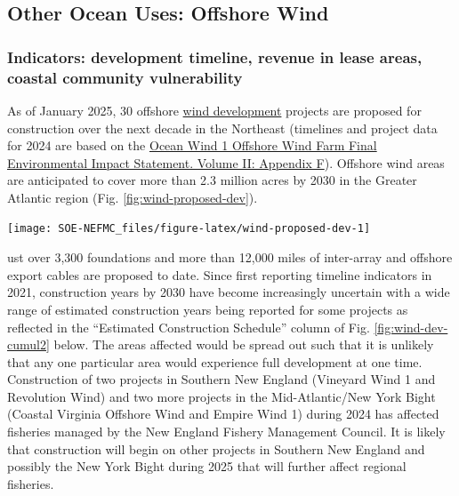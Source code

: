 \documentclass[
  10pt,
]{article}
\let\origfigure\figure
\let\endorigfigure\endfigure
\renewenvironment{figure}[1][2] {
    \expandafter\origfigure\expandafter[H]
} {
    \endorigfigure
}
\begin{document}
\hypertarget{wind-risks}{%
\subsection{Other Ocean Uses: Offshore Wind}\label{wind-risks}}

\hypertarget{indicators-development-timeline-revenue-in-lease-areas-coastal-community-vulnerability}{%
\subsubsection{Indicators: development timeline, revenue in lease areas, coastal community vulnerability}\label{indicators-development-timeline-revenue-in-lease-areas-coastal-community-vulnerability}}

As of January 2025, 30 offshore \href{https://noaa-edab.github.io/catalog/wind_dev_speed.html}{wind development} projects are proposed for construction over the next decade in the Northeast (timelines and project data for 2024 are based on the \href{https://www.boem.gov/sites/default/files/documents/renewable-energy/state-activities/Ocean_Wind1_FEIS_App_F_Planned\%20Activities\%20Scenario.pdf}{Ocean Wind 1 Offshore Wind Farm Final Environmental Impact Statement. Volume II: Appendix F}). Offshore wind areas are anticipated to cover more than 2.3 million acres by 2030 in the Greater Atlantic region (Fig. \ref{fig:wind-proposed-dev}).

\begin{figure}

{\centering \texttt{[image: SOE-NEFMC\_files/figure-latex/wind-proposed-dev-1]} 

}

\caption{Proposed wind development on the northeast shelf.}\label{fig:wind-proposed-dev}
\end{figure}

ust over 3,300 foundations and more than 12,000 miles of inter-array and offshore export cables are proposed to date. Since first reporting timeline indicators in 2021, construction years by 2030 have become increasingly uncertain with a wide range of estimated construction years being reported for some projects as reflected in the ``Estimated Construction Schedule'' column of Fig. \ref{fig:wind-dev-cumul2} below. The areas affected would be spread out such that it is unlikely that any one particular area would experience full development at one time. Construction of two projects in Southern New England (Vineyard Wind 1 and Revolution Wind) and two more projects in the Mid-Atlantic/New York Bight (Coastal Virginia Offshore Wind and Empire Wind 1) during 2024 has affected fisheries managed by the New England Fishery Management Council. It is likely that construction will begin on other projects in Southern New England and possibly the New York Bight during 2025 that will further affect regional fisheries.
\end{document}
